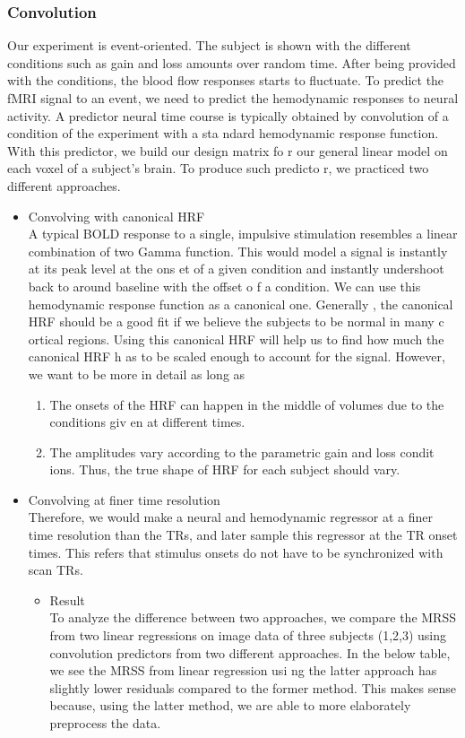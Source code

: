 \subsubsection {Convolution}
Our experiment is event-oriented. The subject is shown with the different conditions 
such as gain and loss amounts over random time. After being provided with the conditions,
 the blood flow responses starts to fluctuate. To predict the fMRI signal to an event, we
  need to predict the hemodynamic responses to neural activity. A predictor neural time 
  course is typically obtained by convolution of a condition of the experiment with a sta
  ndard hemodynamic response function. With this predictor, we build our design matrix fo
  r our general linear model on each voxel of a subject's brain. To produce such predicto
  r, we practiced two different approaches.
\begin{itemize}
\item  Convolving with canonical HRF \\
A typical BOLD response to a single, impulsive stimulation resembles a linear combination 
of two Gamma function. This would model a signal is instantly at its peak level at the ons
et of a given condition and instantly undershoot back to around baseline with the offset o
f a condition. We can use this hemodynamic response function as a canonical one. Generally
, the canonical HRF should be a good fit if we believe the subjects to be normal in many c
ortical regions. Using this canonical HRF will help us to find how much the canonical HRF h
as to be scaled enough to account for the signal. However, we want to be more in detail as 
long as 
\begin{enumerate}
  \item The onsets of the HRF can happen in the middle of volumes due to the conditions giv
en at different times. 
  \item The amplitudes vary according to the parametric gain and loss condit
ions. Thus, the true shape of HRF for each subject should vary.
\end{enumerate}

\item  Convolving at finer time resolution \\
Therefore, we would make a neural and hemodynamic regressor at a finer time resolution than
 the TRs, and later sample this regressor at the TR onset times. This refers that stimulus
  onsets do not have to be synchronized with scan TRs.

\begin{itemize} 
\item Result \\
To analyze the difference between two approaches, we compare the MRSS from two linear 
regressions on image data of three subjects (1,2,3) using convolution predictors from 
two different approaches. In the below table, we see the MRSS from linear regression usi
ng the latter approach has slightly lower residuals compared to the former method. This 
makes sense because, using the latter method, we are able to more elaborately preprocess 
the data.
\end{itemize}
\end{itemize}



